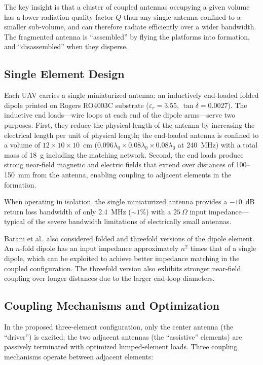The key insight is that a cluster of coupled antennas occupying a given volume has a lower radiation quality factor $Q$ than any single antenna confined to a smaller sub-volume, and can therefore radiate efficiently over a wider bandwidth.  The fragmented antenna is ``assembled'' by flying the platforms into formation, and ``disassembled'' when they disperse.

\subsection{Single Element Design}

Each UAV carries a single miniaturized antenna: an inductively end-loaded folded dipole printed on Rogers RO4003C substrate ($\varepsilon_r = 3.55$, $\tan\delta = 0.0027$).  The inductive end loads---wire loops at each end of the dipole arms---serve two purposes.  First, they reduce the physical length of the antenna by increasing the electrical length per unit of physical length; the end-loaded antenna is confined to a volume of $12 \times 10 \times 10$~cm ($0.096\lambda_0 \times 0.08\lambda_0 \times 0.08\lambda_0$ at 240~MHz) with a total mass of 18~g including the matching network.  Second, the end loads produce strong near-field magnetic and electric fields that extend over distances of 100--150~mm from the antenna, enabling coupling to adjacent elements in the formation.

When operating in isolation, the single miniaturized antenna provides a $-10$~dB return loss bandwidth of only 2.4~MHz ($\sim\!1\%$) with a $25~\Omega$ input impedance---typical of the severe bandwidth limitations of electrically small antennas.

Barani et al.\ also considered folded and threefold versions of the dipole element.  An $n$-fold dipole has an input impedance approximately $n^2$ times that of a single dipole, which can be exploited to achieve better impedance matching in the coupled configuration.  The threefold version also exhibits stronger near-field coupling over longer distances due to the larger end-loop diameters.

\subsection{Coupling Mechanisms and Optimization}

In the proposed three-element configuration, only the center antenna (the ``driver'') is excited; the two adjacent antennas (the ``assistive'' elements) are passively terminated with optimized lumped-element loads.  Three coupling mechanisms operate between adjacent elements:

